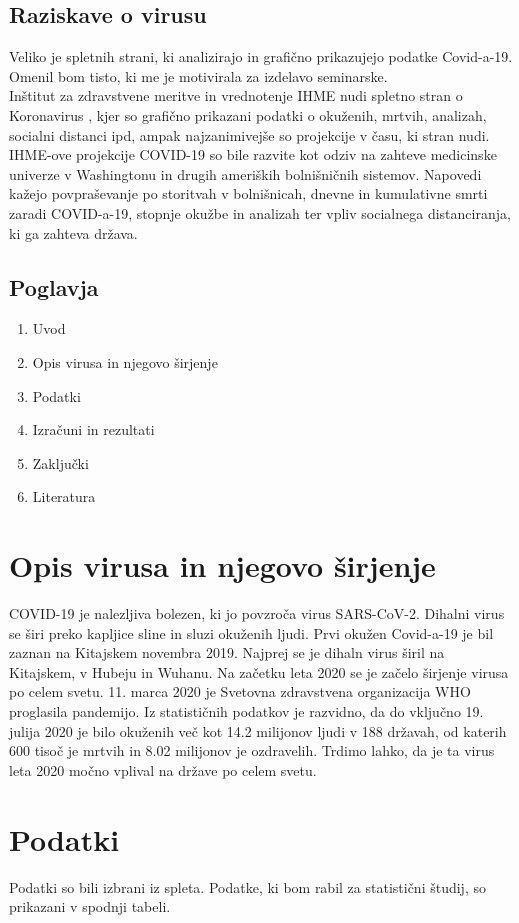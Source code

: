 \documentclass[a4paper,11pt]{article}
\begin{document}
\subsection{Raziskave o virusu}
Veliko je spletnih strani, ki analizirajo in grafično prikazujejo podatke Covid-a-19. Omenil bom tisto, ki me je motivirala za izdelavo seminarske. \\
Inštitut za zdravstvene meritve in vrednotenje IHME nudi spletno stran o Koronavirus \cite{cvd19IHME}, kjer so grafično prikazani podatki o okuženih, mrtvih, analizah, socialni distanci ipd, ampak najzanimivejše so projekcije v času, ki stran nudi. IHME-ove projekcije COVID-19 so bile razvite kot odziv na zahteve medicinske univerze v Washingtonu in drugih ameriških bolnišničnih sistemov. Napovedi kažejo povpraševanje po storitvah v bolnišnicah, dnevne in kumulativne smrti zaradi COVID-a-19, stopnje okužbe in analizah ter vpliv socialnega distanciranja, ki ga zahteva država.

\subsection{Poglavja}
\begin{enumerate}
\item{Uvod}
\item{Opis virusa in njegovo širjenje}
\item{Podatki}
\item{Izračuni in rezultati}
\item{Zaključki}
\item{Literatura}
\end{enumerate}

\section{Opis virusa in njegovo širjenje}
COVID-19 je nalezljiva bolezen, ki jo povzroča virus SARS-CoV-2. Dihalni virus se širi preko kapljice sline in sluzi okuženih ljudi. Prvi okužen Covid-a-19 je bil zaznan na Kitajskem novembra 2019. Najprej se je dihaln virus širil na Kitajskem, v Hubeju in Wuhanu. Na začetku leta 2020 se je začelo širjenje virusa po celem svetu. 11. marca 2020 je Svetovna zdravstvena organizacija WHO proglasila pandemijo. Iz statističnih podatkov je razvidno, da do vključno 19. julija 2020 je bilo okuženih več kot 14.2 milijonov ljudi v 188 državah, od katerih 600 tisoč je mrtvih in 8.02 milijonov je ozdravelih. Trdimo lahko, da je ta virus leta 2020 močno vplival na države po celem svetu.
\section{Podatki}
Podatki so bili izbrani iz spleta. Podatke, ki bom rabil za statistični študij, so prikazani v spodnji tabeli. \\
\begin{center}
\end{center}
\end{document}
